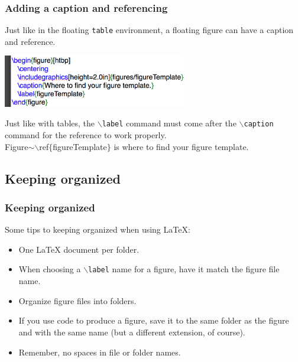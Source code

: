 \documentclass[slidestop,compress,mathserif]{beamer}
\begin{document}
\begin{frame} \frametitle{Adding a caption and referencing}
	Just like in the floating \texttt{\color{highlight}table} environment, a floating figure can have a caption and reference.
	\begin{center}
	\includegraphics[height=0.9in]{basicsOfLatex/figures/figureWithCaptionLabel}
	\end{center}
	Just like with tables, the \texttt{\color{command}$\backslash$label} command must come after the \texttt{\color{command}$\backslash$caption} command for the reference to work properly.
	\vspace{5mm} \\
	Figure$\sim${\color{command}$\backslash$ref}{\color{braces}$\{${\color{black}figureTemplate}$\}$} is where to find your figure template.
\end{frame}

\subsection[Keeping organized]{Keeping organized}
\begin{frame} \frametitle{Keeping organized}
Some tips to keeping organized when using LaTeX:
	\begin{itemize}
		\item One LaTeX document per folder.
		\item When choosing a \texttt{\color{command}$\backslash$label} name for a figure, have it match the figure file name.
		\item Organize figure files into folders.
		\item If you use code to produce a figure, save it to the same folder as the figure and with the same name (but a different extension, of course).
		\item Remember, no spaces in file or folder names.
	\end{itemize}
\end{frame}
\end{document}
